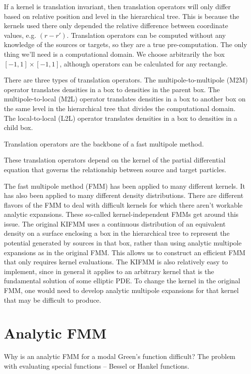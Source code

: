 \documentclass[11pt, oneside]{article}   	%
\begin{document}
If a kernel is translation invariant, then translation operators will only differ based on relative position and level in the hierarchical tree. This is because the kernels used there only depended the relative difference between coordinate values, e.g. $(r-r')$.
Translation operators can be computed without any knowledge of the sources or targets, so they are a true pre-computation. The only thing we'll need is a computational domain. We choose arbitrarily the box $[-1,1]\times[-1,1]$, although operators can be calculated for any rectangle.

There are three types of translation operators. The multipole-to-multipole (M2M) operator translates densities in a box to densities in the parent box. The multipole-to-local (M2L) operator translates densities in a box to another box on the same level in the hierarchical tree that divides the computational domain. The local-to-local (L2L) operator translates densities in a box to densities in a child box.

Translation operators are the backbone of a fast multipole method.

These translation operators depend on the kernel of the partial differential equation that governs the relationship between source and target particles.

The fast multipole method (FMM) has been applied to many different kernels. It has also been applied to many different density distributions. There are different flavors of the FMM to deal with difficult kernels for which there aren't workable analytic expansions. These so-called kernel-independent FMMs get around this issue. The original KIFMM uses a continuous distribution of an equivalent density on a surface enclosing a box in the hierarchical tree to represent the potential generated by sources in that box, rather than using analytic multipole expansions as in the original FMM. This allows us to construct an efficient FMM that only requires kernel evaluations. The KIFMM is also relatively easy to implement, since in general it applies to an arbitrary kernel that is the fundamental solution of some elliptic PDE. To change the kernel in the original FMM, one would need to develop analytic multipole expansions for that kernel that may be difficult to produce.
\section{Analytic FMM}
Why is an analytic FMM for a modal Green's function difficult? The problem with evaluating special functions -- Bessel or Hankel functions.
\end{document}
